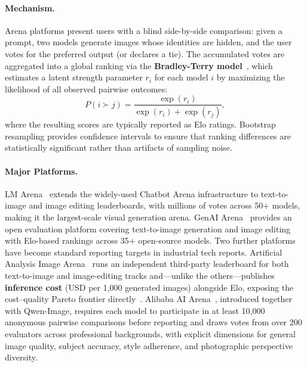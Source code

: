 \paragraph{Mechanism.} Arena platforms present users with a blind side-by-side comparison: given a prompt, two models generate images whose identities are hidden, and the user votes for the preferred output (or declares a tie). The accumulated votes are aggregated into a global ranking via the \textbf{Bradley-Terry model}~\citep{ChatbotArena}, which estimates a latent strength parameter $r_i$ for each model $i$ by maximizing the likelihood of all observed pairwise outcomes:
\begin{equation}
    P(i \succ j) = \frac{\exp(r_i)}{\exp(r_i) + \exp(r_j)},
\end{equation}
where the resulting scores are typically reported as Elo ratings. Bootstrap resampling provides confidence intervals to ensure that ranking differences are statistically significant rather than artifacts of sampling noise.

\paragraph{Major Platforms.} LM Arena~\citep{ChatbotArena} extends the widely-used Chatbot Arena infrastructure to text-to-image and image editing leaderboards, with millions of votes across 50+ models, making it the largest-scale visual generation arena. GenAI Arena~\citep{GenAI-Arena} provides an open evaluation platform covering text-to-image generation and image editing with Elo-based rankings across 35+ open-source models. Two further platforms have become standard reporting targets in industrial tech reports. Artificial Analysis Image Arena~\citep{aaarena2025} runs an independent third-party leaderboard for both text-to-image and image-editing tracks and---unlike the others---publishes \textbf{inference cost} (USD per 1{,}000 generated images) alongside Elo, exposing the cost--quality Pareto frontier directly~\citep{seedream2025seedream, gao2025seedream, cai2025z}. Alibaba AI Arena~\citep{wu2025qwen}, introduced together with Qwen-Image, requires each model to participate in at least 10{,}000 anonymous pairwise comparisons before reporting and draws votes from over 200 evaluators across professional backgrounds, with explicit dimensions for general image quality, subject accuracy, style adherence, and photographic perspective diversity.

